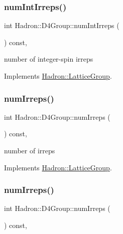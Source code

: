 \subsubsection{\texorpdfstring{numIntIrreps()}{numIntIrreps()}\hspace{0.1cm}{\footnotesize\ttfamily [2/2]}}
{\footnotesize\ttfamily int Hadron\+::\+D4\+Group\+::num\+Int\+Irreps (\begin{DoxyParamCaption}{ }\end{DoxyParamCaption}) const\hspace{0.3cm}{\ttfamily [inline]}, {\ttfamily [virtual]}}

number of integer-\/spin irreps 

Implements \mbox{\hyperlink{structHadron_1_1LatticeGroup_af2aa7b39222bf188389356eefcef7547}{Hadron\+::\+Lattice\+Group}}.

\mbox{\label{structHadron_1_1D4Group_ae8b007038fb1aa79a7267feebf356d4c}} 
\subsubsection{\texorpdfstring{numIrreps()}{numIrreps()}\hspace{0.1cm}{\footnotesize\ttfamily [1/2]}}
{\footnotesize\ttfamily int Hadron\+::\+D4\+Group\+::num\+Irreps (\begin{DoxyParamCaption}{ }\end{DoxyParamCaption}) const\hspace{0.3cm}{\ttfamily [inline]}, {\ttfamily [virtual]}}

number of irreps 

Implements \mbox{\hyperlink{structHadron_1_1LatticeGroup_a3edaca488144b5d2a9cf73fe653add34}{Hadron\+::\+Lattice\+Group}}.

\mbox{\label{structHadron_1_1D4Group_ae8b007038fb1aa79a7267feebf356d4c}} 
\subsubsection{\texorpdfstring{numIrreps()}{numIrreps()}\hspace{0.1cm}{\footnotesize\ttfamily [2/2]}}
{\footnotesize\ttfamily int Hadron\+::\+D4\+Group\+::num\+Irreps (\begin{DoxyParamCaption}{ }\end{DoxyParamCaption}) const\hspace{0.3cm}{\ttfamily [inline]}, {\ttfamily [virtual]}}

